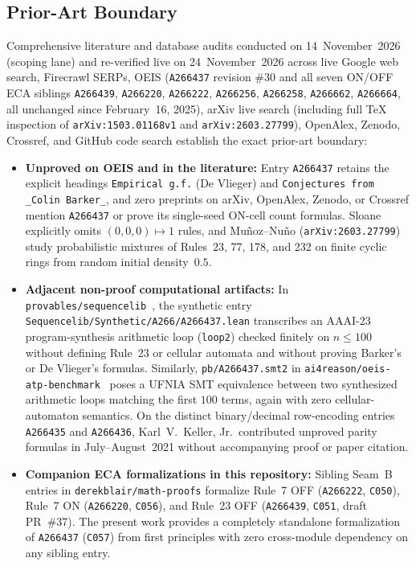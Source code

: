 \documentclass[11pt]{article}
\theoremstyle{definition}
\newcommand{\seq}[1]{\texttt{#1}}
\begin{document}
\subsection{Prior-Art Boundary}

Comprehensive literature and database audits conducted on 14~November~2026 (scoping lane) and re-verified live on 24~November~2026 across live Google web search, Firecrawl SERPs, OEIS (\seq{A266437} revision \#30 and all seven ON/OFF ECA siblings \seq{A266439}, \seq{A266220}, \seq{A266222}, \seq{A266256}, \seq{A266258}, \seq{A266662}, \seq{A266664}, all unchanged since February~16, 2025), arXiv live search (including full TeX inspection of \texttt{arXiv:1503.01168v1} and \texttt{arXiv:2603.27799}), OpenAlex, Zenodo, Crossref, and GitHub code search establish the exact prior-art boundary:
\begin{itemize}
\item \textbf{Unproved on OEIS and in the literature:} Entry \seq{A266437} retains the explicit headings \texttt{Empirical g.f.} (De Vlieger) and \texttt{Conjectures from \_Colin Barker\_}, and zero preprints on arXiv, OpenAlex, Zenodo, or Crossref mention \seq{A266437} or prove its single-seed ON-cell count formulas. Sloane~\cite{sloane2015} explicitly omits $(0, 0, 0) \mapsto 1$ rules, and Mu\~noz--Nu\~no (\texttt{arXiv:2603.27799}) study probabilistic mixtures of Rules~23, 77, 178, and 232 on finite cyclic rings from random initial density~$0.5$.
\item \textbf{Adjacent non-proof computational artifacts:} In \nolinkurl{provables/sequencelib}~\cite{sequencelib}, the synthetic entry \nolinkurl{Sequencelib/Synthetic/A266/A266437.lean} transcribes an AAAI-23 program-synthesis arithmetic loop (\texttt{loop2}) checked finitely on $n \le 100$ without defining Rule~23 or cellular automata and without proving Barker's or De Vlieger's formulas. Similarly, \nolinkurl{pb/A266437.smt2} in \nolinkurl{ai4reason/oeis-atp-benchmark}~\cite{oeisatp} poses a UFNIA SMT equivalence between two synthesized arithmetic loops matching the first $100$ terms, again with zero cellular-automaton semantics. On the distinct binary/decimal row-encoding entries \seq{A266435} and \seq{A266436}, Karl~V.\ Keller, Jr.\ contributed unproved parity formulas in July--August~2021 without accompanying proof or paper citation.
\item \textbf{Companion ECA formalizations in this repository:} Sibling Seam~B entries in \texttt{derekblair/math-proofs} formalize Rule~7 OFF (\seq{A266222}, \texttt{C050}), Rule~7 ON (\seq{A266220}, \texttt{C056}), and Rule~23 OFF (\seq{A266439}, \texttt{C051}, draft PR~\#37). The present work provides a completely standalone formalization of \seq{A266437} (\texttt{C057}) from first principles with zero cross-module dependency on any sibling entry.
\end{itemize}
\end{document}
